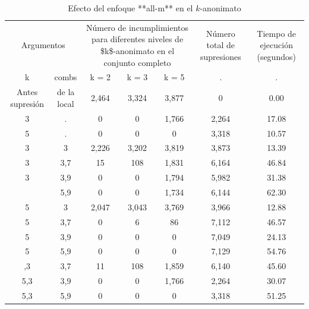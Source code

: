 \documentclass[]{book}
\theoremstyle{definition}
\theoremstyle{definition}
\theoremstyle{definition}
\theoremstyle{definition}
\theoremstyle{remark}
\begin{document}
\begin{table}

\caption{\label{tab:Tabla11}\label{tab:Tabla11}Efecto del enfoque **all-m** en el $k$-anonimato}
\centering
\begin{tabular}[t]{ccccccc}
\toprule
\multicolumn{2}{c}{Argumentos} & \multicolumn{3}{c}{Número de incumplimientos para diferentes niveles de \$k\$-anonimato en el conjunto completo} & \multicolumn{1}{c}{Número total de supresiones} & \multicolumn{1}{c}{Tiempo de ejecución (segundos)} \\
\cmidrule(l{3pt}r{3pt}){1-2} \cmidrule(l{3pt}r{3pt}){3-5} \cmidrule(l{3pt}r{3pt}){6-6} \cmidrule(l{3pt}r{3pt}){7-7}
\multicolumn{1}{c}{k} & \multicolumn{1}{c}{combs} & \multicolumn{1}{c}{k = 2} & \multicolumn{1}{c}{k = 3} & \multicolumn{1}{c}{k = 5} & \multicolumn{1}{c}{.} & \multicolumn{1}{c}{.} \\
\cmidrule(l{3pt}r{3pt}){1-1} \cmidrule(l{3pt}r{3pt}){2-2} \cmidrule(l{3pt}r{3pt}){3-3} \cmidrule(l{3pt}r{3pt}){4-4} \cmidrule(l{3pt}r{3pt}){5-5} \cmidrule(l{3pt}r{3pt}){6-6} \cmidrule(l{3pt}r{3pt}){7-7}
Antes supresión & de la local & 2,464 & 3,324 & 3,877 & 0 & 0.00\\
\midrule
3 & . & 0 & 0 & 1,766 & 2,264 & 17.08\\
5 & . & 0 & 0 & 0 & 3,318 & 10.57\\
3 & 3 & 2,226 & 3,202 & 3,819 & 3,873 & 13.39\\
3 & 3,7 & 15 & 108 & 1,831 & 6,164 & 46.84\\
3 & 3,9 & 0 & 0 & 1,794 & 5,982 & 31.38\\
\addlinespace
3 & 5,9 & 0 & 0 & 1,734 & 6,144 & 62.30\\
5 & 3 & 2,047 & 3,043 & 3,769 & 3,966 & 12.88\\
5 & 3,7 & 0 & 6 & 86 & 7,112 & 46.57\\
5 & 3,9 & 0 & 0 & 0 & 7,049 & 24.13\\
5 & 5,9 & 0 & 0 & 0 & 7,129 & 54.76\\
\addlinespace
5,3 & 3,7 & 11 & 108 & 1,859 & 6,140 & 45.60\\
5,3 & 3,9 & 0 & 0 & 1,766 & 2,264 & 30.07\\
5,3 & 5,9 & 0 & 0 & 0 & 3,318 & 51.25\\
\bottomrule
\end{tabular}
\end{table}
\end{document}

